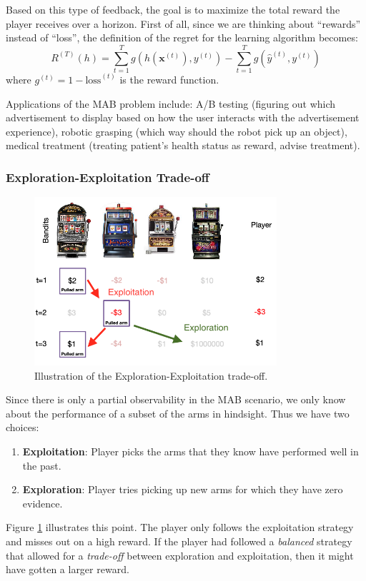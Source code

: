 \documentclass[11pt]{article}
\begin{document}
Based on this type of feedback, the goal is to maximize the total reward the player receives over
a horizon. First of all, since we are thinking about ``rewards'' instead of ``loss'', the
definition of the regret for the learning algorithm becomes:
$$R^{(T)}(h) = \sum_{t=1}^T g(h(\boldsymbol{x}^{(t)}), y^{(t)}) - \sum_{t=1}^T g(\hat{y}^{(t)}, y^{(t)})$$
where $g^{(t)} = 1 - \text{loss}^{(t)}$ is the reward function.

Applications of the MAB problem include: A/B testing (figuring out which advertisement to display based on how
the user interacts with the advertisement experience), robotic grasping (which way should the robot pick up
an object), medical treatment (treating patient's health status as reward, advise treatment).

\subsubsection{Exploration-Exploitation Trade-off}
\begin{figure}[H]
    \centering
    \includegraphics[width=0.8\textwidth]{images/bandits_t_3.png}
    \caption{Illustration of the Exploration-Exploitation trade-off.}
    \label{fig:explore-exploit}
\end{figure}

Since there is only a partial observability in the MAB scenario, we only know about the performance of a subset
of the arms in hindsight. Thus we have two choices:
\begin{enumerate}
    \item \textbf{Exploitation}: Player picks the arms that they know have performed well in the past.
    \item \textbf{Exploration}: Player tries picking up new arms for which they have zero evidence.
\end{enumerate}
Figure \ref{fig:explore-exploit} illustrates this point. The player only follows the exploitation strategy and
misses out on a high reward. If the player had followed a \textit{balanced} strategy that allowed for a
\textit{trade-off} between exploration and exploitation, then it might have gotten a larger reward.
\end{document}
